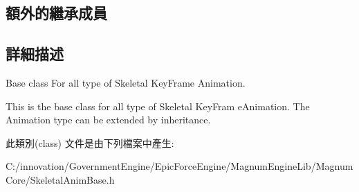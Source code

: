 \subsection*{額外的繼承成員}


\subsection{詳細描述}
Base class For all type of Skeletal Key\+Frame Animation. 

This is the base class for all type of Skeletal Key\+Fram e\+Animation. The Animation type can be extended by inheritance. 

此類別(class) 文件是由下列檔案中產生\+:\begin{DoxyCompactItemize}
\item 
C\+:/innovation/\+Government\+Engine/\+Epic\+Force\+Engine/\+Magnum\+Engine\+Lib/\+Magnum\+Core/Skeletal\+Anim\+Base.\+h\end{DoxyCompactItemize}
